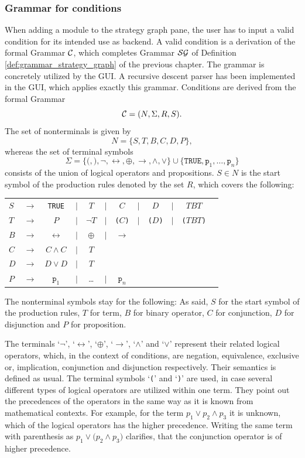 \subsubsection{Grammar for conditions}
\label{sec:grammar_for_backend_conditions}
When adding a module to the strategy graph pane, the user has to input a valid condition for its intended use as backend. A valid condition is a derivation of the formal Grammar $\cal C$, which completes Grammar $\cal SG$ of Definition \ref{def:grammar_strategy_graph} of the previous chapter. The grammar is concretely utilized by the GUI. A recursive descent parser \cite{ALSU07} has been implemented in the GUI, which applies exactly this grammar.
Conditions are derived from the formal Grammar $${\cal C}=(N, \Sigma, R, S).$$ The set of nonterminals is given by $$N=\{S, T, B, C, D, P\},$$ whereas the set of terminal symbols $$\Sigma=\{\texttt{(}, \texttt{)}, \neg, \leftrightarrow, \oplus, \rightarrow, \land, \lor\} \cup \{\texttt{TRUE}, \texttt{p}_1, \dots, \texttt{p}_n \}$$ consists of the union of logical operators and propositions. $S \in N$ is the start symbol of the production rules denoted by the set $R$, which covers the following:
\begin{center}
\begin{tabular}{lccccccccccc}
  $S$ & $\rightarrow$ & \texttt{TRUE} & $|$ & $T$ & $|$ & $C$ & $|$ & $D$ & $|$ & $TBT$ \\
  $T$ & $\rightarrow$ & $P$ & $|$ & $\neg T$ & $|$ & \texttt{(}$C$\texttt{)} & $|$ & \texttt{(}$D$\texttt{)} & $|$ & \texttt{(}$TBT$\texttt{)} \\
  $B$ & $\rightarrow$ & $\leftrightarrow$ & $|$ & $\oplus$ & $|$ & $\rightarrow$ \\
  $C$ & $\rightarrow$ & $C\land C$ & $|$ & $T$ \\
  $D$ & $\rightarrow$ & $D\lor D$ & $|$ & $T$ \\
  $P$ & $\rightarrow$ & $\texttt{p}_1$ & $|$ & \dots & $|$ & $\texttt{p}_n$ \\
\end{tabular}
\end{center}

The nonterminal symbols stay for the following: As said, $S$ for the start symbol of the production rules, $T$ for term, $B$ for binary operator, $C$ for conjunction, $D$ for disjunction and $P$ for proposition.

The terminals `$\neg$', `$\leftrightarrow$', `$\oplus$', `$\rightarrow$', `$\land$' and `$\lor$' represent their related logical operators, which, in the context of conditions, are negation, equivalence, exclusive or, implication, conjunction and disjunction respectively. Their semantics is defined as usual. The terminal symbols `\texttt{(}' and `\texttt{)}' are used, in case several different types of logical operators are utilized within one term. They point out the precedences of the operators in the same way as it is known from mathematical contexts. For example, for the term $p_1 \lor p_2 \land p_3$ it is unknown, which of the logical operators has the higher precedence. Writing the same term with parenthesis as $p_1 \lor (p_2 \land p_3 \texttt{)}$ clarifies, that the conjunction operator is of higher precedence.

